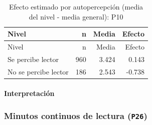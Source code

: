\documentclass[
  spanish,
  11pt,
]{extarticle}
\begin{document}
\begin{longtable}[]{@{}lrrr@{}}
\caption{Efecto estimado por autopercepción (media del nivel - media
general): P10}\tabularnewline
\toprule\noalign{}
Nivel & n & Media & Efecto \\
\midrule\noalign{}
\endfirsthead
\toprule\noalign{}
Nivel & n & Media & Efecto \\
\midrule\noalign{}
\endhead
\bottomrule\noalign{}
\endlastfoot
Se percibe lector & 960 & 3.424 & 0.143 \\
No se percibe lector & 186 & 2.543 & -0.738 \\
\end{longtable}

\paragraph{Interpretación}\label{interpretaciuxf3n-1}

\subsubsection{\texorpdfstring{Minutos continuos de lectura
(\texttt{P26})}{Minutos continuos de lectura (P26)}}\label{minutos-continuos-de-lectura-p26}
\end{document}
